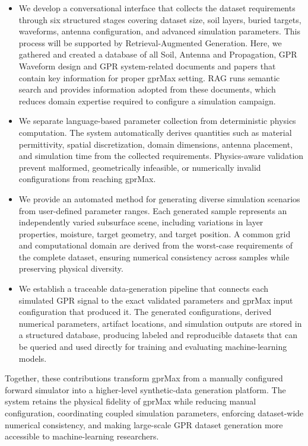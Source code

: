 \documentclass[journal]{IEEEtran}
\begin{document}
\begin{itemize}
\item We develop a conversational interface that collects the dataset requirements through six structured stages covering dataset size, soil layers, buried targets, waveforms, antenna configuration, and advanced simulation parameters. This process will be supported by Retrieval-Augmented Generation. Here, we gathered and created a database of all Soil, Antenna and Propagation, GPR Waveform design and GPR system-related documents and papers that contain key information for proper gprMax setting. RAG runs semantic search and provides information adopted from these documents, which reduces domain expertise required to configure a simulation campaign.


\item We separate language-based parameter collection from deterministic physics computation. The system automatically derives quantities such as material permittivity, spatial discretization, domain dimensions, antenna placement, and simulation time from the collected requirements. Physics-aware validation prevent malformed, geometrically infeasible, or numerically invalid configurations from reaching gprMax.

\item We provide an automated method for generating diverse simulation scenarios from user-defined parameter ranges. Each generated sample represents an independently varied subsurface scene, including variations in layer properties, moisture, target geometry, and target position. A common grid and computational domain are derived from the worst-case requirements of the complete dataset, ensuring numerical consistency across samples while preserving physical diversity.

\item We establish a traceable data-generation pipeline that connects each simulated GPR signal to the exact validated parameters and gprMax input configuration that produced it. The generated configurations, derived numerical parameters, artifact locations, and simulation outputs are stored in a structured database, producing labeled and reproducible datasets that can be queried and used directly for training and evaluating machine-learning models.


\end{itemize}

Together, these contributions transform gprMax from a manually configured forward simulator into a higher-level synthetic-data generation platform. The system retains the physical fidelity of gprMax while reducing manual configuration, coordinating coupled simulation parameters, enforcing dataset-wide numerical consistency, and making large-scale GPR dataset generation more accessible to machine-learning researchers.
\end{document}
